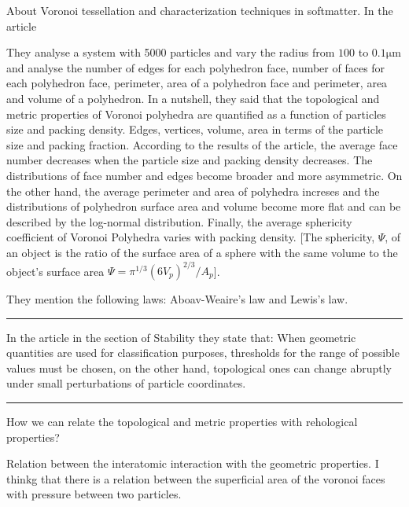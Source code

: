 \documentclass[a4paper, 11pt, oneside]{researchjournal} %
\author{Fco. Vázquez}
\begin{document}


 About Voronoi tessellation and characterization techniques in softmatter.
In the article \textcite{yangVoronoiTessellationPacking2002} 

They analyse a system with 5000 particles and vary the radius from $100$ to $0.1\mathrm{\mu m}$ and analyse the number of edges for each polyhedron face, number of faces for each polyhedron face, perimeter, area of a polyhedron face and perimeter, area and volume of a polyhedron.
In a nutshell, they said that the topological and metric properties of Voronoi polyhedra are quantified as a function of particles size and packing density.
Edges, vertices, volume, area in terms of the particle size and packing fraction.
According to the results of the article, the average face number decreases when the particle size and packing density decreases.
The distributions of face number and edges become broader and more asymmetric.
On the other hand, the average perimeter and area of polyhedra increses and the distributions of polyhedron surface area and volume become more flat and can be described by the log-normal distribution.
Finally, the average sphericity coefficient of Voronoi Polyhedra varies with packing density.
[The sphericity, $ \Psi $, of an object is the ratio of the surface area of a sphere with the same volume to the object's surface area $\Psi=\pi^{1/3}\left(6V_{p}\right)^{2/3}/A_{p}$].

They mention the following laws: Aboav-Weaire's law and Lewis's law.


\rule{\textwidth}{0.4pt}

In the article \cite{lazarVoronoiCellAnalysis2022} 
in the section of Stability they state that:
When geometric quantities are used for classification purposes, thresholds for the range of possible values must be chosen, on the other hand, topological ones can change abruptly under small perturbations of particle coordinates.


\rule{\textwidth}{0.4pt}

How we can relate the topological and metric properties with rehological properties?

Relation between the interatomic interaction with the geometric properties.
I thinkg that there is a relation between the superficial area of the voronoi faces with pressure between two particles.
\end{document}
